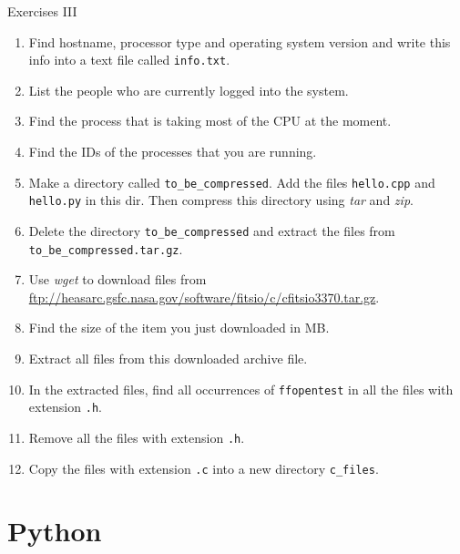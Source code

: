 \documentclass{beamer}
\begin{document}
\begin{frame}{Exercises III}
  \fontsize{8pt}{8}\selectfont
  \begin{enumerate}
    \item Find hostname, processor type and operating system version and write this info into a text file called \texttt{info.txt}.
    \item List the people who are currently logged into the system.
    \item Find the process that is taking most of the CPU at the moment.
    \item Find the IDs of the processes that you are running.
    \item Make a directory called \texttt{to\_be\_compressed}. Add the files \texttt{hello.cpp} and \texttt{hello.py} in this dir.
    Then compress this directory using \textit{tar} and \textit{zip}.
    \item Delete the directory \texttt{to\_be\_compressed} and extract the files from \texttt{to\_be\_compressed.tar.gz}.
    \item Use \textit{wget} to download files from \url{ftp://heasarc.gsfc.nasa.gov/software/fitsio/c/cfitsio3370.tar.gz}.
    \item Find the size of the item you just downloaded in MB.
    \item Extract all files from this downloaded archive file.
    \item In the extracted files, find all occurrences of \texttt{ffopentest} in all the files with extension \texttt{.h}.
    \item Remove all the files with extension \texttt{.h}.
    \item Copy the files with extension \texttt{.c} into a new directory \texttt{c\_files}.
  \end{enumerate}
\end{frame}

\section{Python}
\end{document}
